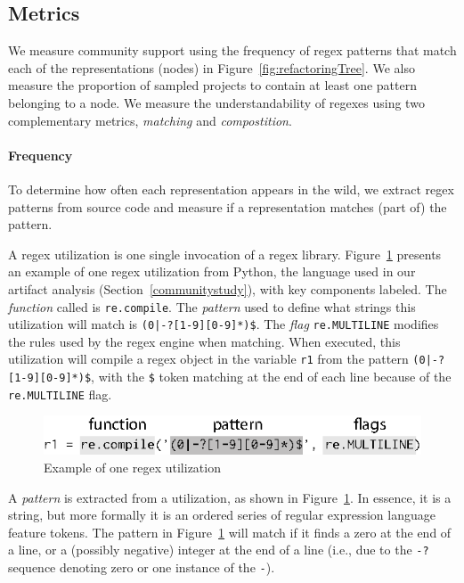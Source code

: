 \subsection{Metrics}
\label{sec:metric}
We measure community support using the frequency of regex patterns that match each of the representations (nodes) in Figure~\ref{fig:refactoringTree}.  We also measure the proportion of sampled projects to contain at least one pattern belonging to a node.  We measure the understandability of regexes using two complementary metrics, \emph{matching} and \emph{compostition}.

\paragraph{Frequency}
To determine how often each representation appears in the wild, we extract regex patterns from source code and measure if a representation matches (part of) the pattern.

A regex {utilization} is one single invocation of a regex library.
Figure~\ref{fig:exampleUsage} presents an example of one regex {utilization} from Python, the language used in our artifact analysis (Section~\ref{communitystudy}), with key components labeled. The \emph{function} called is {\tt re.compile}.  The \emph{pattern} used to define what strings this utilization will match is \verb!(0|-?[1-9][0-9]*)$!.  The \emph{flag} {\tt re.MULTILINE} modifies the rules used by the regex engine when matching. When executed, this {utilization}  will compile a regex object in the variable {\tt r1} from the pattern \verb!(0|-?[1-9][0-9]*)$!, with the \verb!$! token matching at the end of each line because of the {\tt re.MULTILINE} flag.

\begin{figure}[tb]
\centering
\includegraphics[width=\columnwidth]{illustrations/exampleUsage.eps}
\vspace{-12pt}
\caption{Example of one regex utilization}
\vspace{-6pt}
\label{fig:exampleUsage}
\end{figure}

A \emph{pattern} is extracted from a utilization, as shown in Figure~\ref{fig:exampleUsage}. In essence, it is a string, but more formally it is an ordered series of regular expression language feature tokens.  The pattern in Figure~\ref{fig:exampleUsage}  will match if it finds a zero at the end of a line, or a (possibly negative) integer at the end of a line (i.e., due to the {\tt -?} sequence denoting zero or one instance of the {\tt -}).

